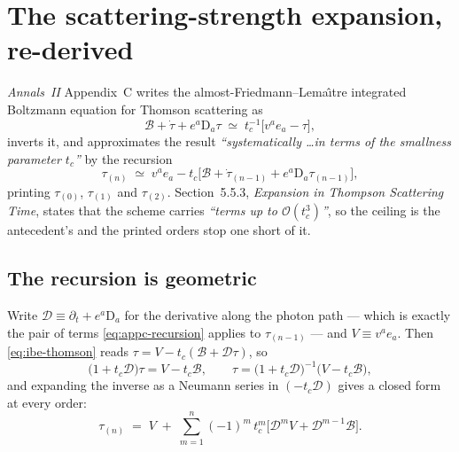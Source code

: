 %
\section{The scattering-strength expansion, re-derived}
\label{sec:scattering-expansion}

\emph{Annals~II} Appendix~C writes the almost-Friedmann--Lema\^{\i}tre
integrated Boltzmann equation for Thomson scattering as
\begin{equation}
  \mathcal B+\dot\tau+e^a\mathrm D_a\tau \;\simeq\; t_c^{-1}\big[v^ae_a-\tau\big],
  \label{eq:ibe-thomson}
\end{equation}
inverts it, and approximates the result \emph{``systematically \dots in terms
of the smallness parameter $t_c$''} by the recursion
\begin{equation}
  \tau_{(n)} \;\simeq\; v^ae_a-t_c\Big[\mathcal B+\dot\tau_{(n-1)}
  +e^a\mathrm D_a\tau_{(n-1)}\Big],
  \label{eq:appc-recursion}
\end{equation}
printing $\tau_{(0)}$, $\tau_{(1)}$ and $\tau_{(2)}$. Section~5.5.3,
\emph{Expansion in Thompson Scattering Time}, states that the scheme carries
\emph{``terms up to $\mathcal O(t_c^3)$''}, so the ceiling is the antecedent's
and the printed orders stop one short of it.

\subsection{The recursion is geometric}

Write $\mathcal D\equiv\partial_t+e^a\mathrm D_a$ for the derivative along the
photon path --- which is exactly the pair of terms \eqref{eq:appc-recursion}
applies to $\tau_{(n-1)}$ --- and $V\equiv v^ae_a$. Then
\eqref{eq:ibe-thomson} reads $\tau=V-t_c(\mathcal B+\mathcal D\tau)$, so
\begin{equation}
  \big(1+t_c\mathcal D\big)\tau=V-t_c\mathcal B,
  \qquad
  \tau=\big(1+t_c\mathcal D\big)^{-1}\big(V-t_c\mathcal B\big),
  \label{eq:closed-operator}
\end{equation}
and expanding the inverse as a Neumann series in $(-t_c\mathcal D)$ gives a
closed form at every order:
\begin{equation}
  \boxed{\;\tau_{(n)}\;=\;V\;+\;\sum_{m=1}^{n}(-1)^m\,t_c^m
  \Big[\mathcal D^{m}V+\mathcal D^{m-1}\mathcal B\Big].\;}
  \label{eq:closed-form}
\end{equation}

